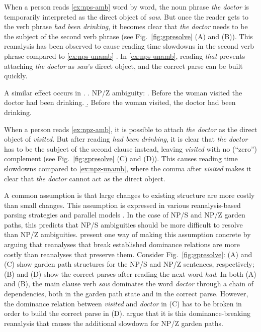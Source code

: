 \documentclass[a4paper, 12pt]{article}
\begin{document}
When a person reads \ref{ex:nps-amb} word by word, the noun phrase \emph{the
    doctor} is temporarily interpreted as the direct object of \emph{saw}. But
once the reader gets to the verb phrase \emph{had been drinking}, it becomes
clear that \emph{the doctor} needs to be the subject of the second verb phrase (see
Fig.~\ref{fig:gpresolve} (A) and (B)).
This reanalysis has been observed to cause reading time slowdowns in the second
verb phrase compared to \ref{ex:nps-unamb} \citep{sturt1999structural,
    grodner2003against, prasad2019how}.
In \ref{ex:nps-unamb}, reading \emph{that} prevents attaching
\emph{the doctor} as \emph{saw}'s direct object, and the correct parse can be
built quickly.

A similar effect occurs in \Next. \ex.\label{ex:npz} NP/Z ambiguity: \a.
\label{ex:npz-amb} Before the woman visited the doctor had been drinking.
\b.\label{ex:npz-unamb} Before the woman visited, the doctor had been drinking.

When a person reads \ref{ex:npz-amb}, it is possible to attach \emph{the
    doctor} as the direct object of \emph{visited}. But after reading \emph{had
    been drinking}, it is clear that \emph{the doctor} has to be the subject of
the second clause instead, leaving \emph{visited} with no (``zero'') complement
(see Fig.~\ref{fig:gpresolve} (C) and (D)). This causes reading time slowdowns
compared to \ref{ex:npz-unamb}, where the comma after \emph{visited} makes it
clear that \emph{the doctor} cannot act as the direct object.

A common assumption is that large changes to existing structure are more costly
than small changes. This assumption is expressed in various reanalysis-based
parsing strategies \citep[see][for discussion]{sturt1999structural} and
parallel models \citep[e.g.,][]{levy2008expectation}. In the case of NP/S and
NP/Z garden paths, this predicts that NP/S ambiguities should be more difficult
to resolve than NP/Z ambiguities. \citet{sturt1999structural} present one way
of making this assumption concrete by arguing that reanalyses that break
established dominance relations are more costly than reanalyses that preserve
them. Consider Fig.~\ref{fig:gpresolve}: (A) and (C) show garden path
structures for the NP/S and NP/Z sentences, respectively; (B) and (D) show the
correct parses after reading the next word \emph{had}. In both (A) and (B), the
main clause verb \emph{saw} dominates the word \emph{doctor} through a chain of
dependencies, both in the garden path state and in the correct parse. However,
the dominance relation between \emph{visited} and \emph{doctor} in (C) has to
be broken in order to build the correct parse in (D).
\citet{sturt1999structural} argue that it is this dominance-breaking reanalysis
that causes the additional slowdown for NP/Z garden paths.
\end{document}
